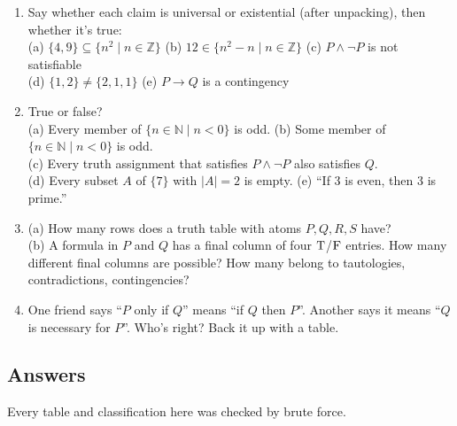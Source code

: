 \begin{enumerate}[label=\textbf{\arabic*.},leftmargin=1.8em,itemsep=0.35em]
  (c) The formula $p$ is a tautology. \quad (d) No square of an integer is negative.
  \item Say whether each claim is universal or existential (after unpacking), then whether it's true:\\
  (a) $\{4,9\}\subseteq\{n^2\mathrel{|} n\in\mathbb{Z}\}$ \quad (b) $12\in\{n^2-n\mathrel{|} n\in\mathbb{Z}\}$ \quad (c) $P\land\lnot P$ is not satisfiable\\
  (d) $\{1,2\}\neq\{2,1,1\}$ \quad (e) $P\to Q$ is a contingency
  \item True or false?\\
  (a) Every member of $\{n\in\mathbb{N}\mathrel{|} n<0\}$ is odd. \quad (b) Some member of $\{n\in\mathbb{N}\mathrel{|} n<0\}$ is odd.\\
  (c) Every truth assignment that satisfies $P\land\lnot P$ also satisfies $Q$.\\
  (d) Every subset $A$ of $\{7\}$ with $|A|=2$ is empty. \quad (e) ``If 3 is even, then 3 is prime.''
  \item (a) How many rows does a truth table with atoms $P,Q,R,S$ have?\\
  (b) A formula in $P$ and $Q$ has a final column of four $\mathrm{T}$/$\mathrm{F}$ entries. How many different final columns are possible? How many belong to tautologies, contradictions, contingencies?
  \item One friend says ``$P$ only if $Q$'' means ``if $Q$ then $P$''. Another says it means ``$Q$ is necessary for $P$''. Who's right? Back it up with a table.
\end{enumerate}

\subsection{Answers}

Every table and classification here was checked by brute force.

